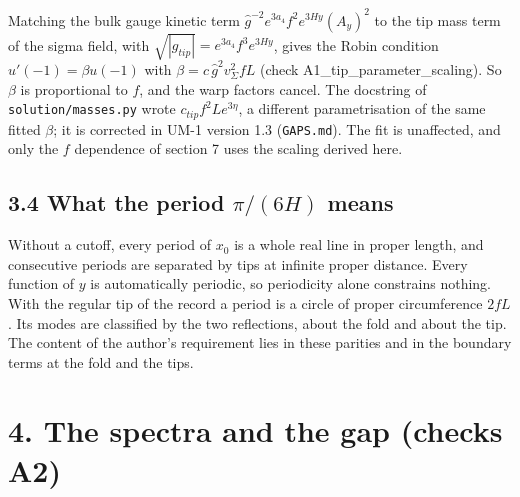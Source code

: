 \documentclass[11pt]{article}
\begin{document}
Matching the bulk gauge kinetic term $\hat g^{-2}e^{3a_4}f^2e^{3Hy}(A_y)^2$ to the tip mass term of the sigma field, with $\sqrt{|g_{tip}|} = e^{3a_4}f^3e^{3Hy}$, gives the Robin condition $u'(-1) = \beta u(-1)$ with $\beta = c\,\hat g^2v_\Sigma^2fL$ (check A1\_tip\_parameter\_scaling). So $\beta$ is proportional to $f$, and the warp factors cancel. The docstring of \texttt{solution/\allowbreak{}masses.\allowbreak{}py} wrote $c_{tip}f^2Le^{3\eta}$, a different parametrisation of the same fitted $\beta$; it is corrected in UM-1 version 1.3 (\texttt{GAPS.\allowbreak{}md}). The fit is unaffected, and only the $f$ dependence of section 7 uses the scaling derived here.

\subsection*{3.4 What the period $\pi/(6H)$ means}

Without a cutoff, every period of $x_0$ is a whole real line in proper length, and consecutive periods are separated by tips at infinite proper distance. Every function of $y$ is automatically periodic, so periodicity alone constrains nothing. With the regular tip of the record a period is a circle of proper circumference $2fL$. Its modes are classified by the two reflections, about the fold and about the tip. The content of the author's requirement lies in these parities and in the boundary terms at the fold and the tips.

\section*{4. The spectra and the gap (checks A2)}
\end{document}
